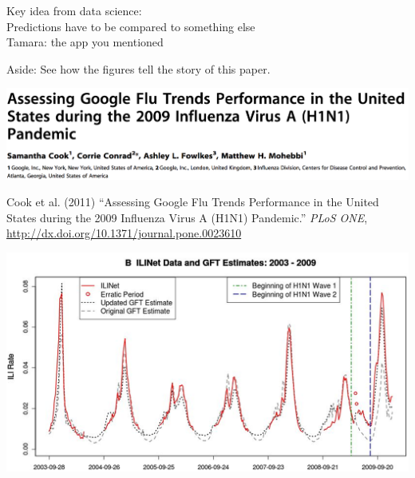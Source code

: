 \documentclass[aspectratio=169]{beamer}
\def\vf{\vfill}
\begin{document}
\begin{frame}

Key idea from data science:\\
Predictions have to be compared to something else\\
\pause
Tamara: the app you mentioned

\end{frame}
\begin{frame}

{\Large
\begin{center}
Aside: See how the figures tell the story of this paper.
\end{center}
}

\end{frame}
\begin{frame}

\begin{center}
\includegraphics[width=\textwidth]{figures/cook_assessing_2011_title}
\end{center}

\vf

Cook et al. (2011) ``Assessing Google Flu Trends Performance in the United States during the 2009 Influenza Virus A (H1N1) Pandemic.'' \textit{PLoS ONE}, \url{http://dx.doi.org/10.1371/journal.pone.0023610}

\end{frame}
\begin{frame}

\begin{center}
\includegraphics[width=\textwidth]{figures/cook_assessing_2011_fig2b}
\end{center}

\end{frame}
\end{document}
